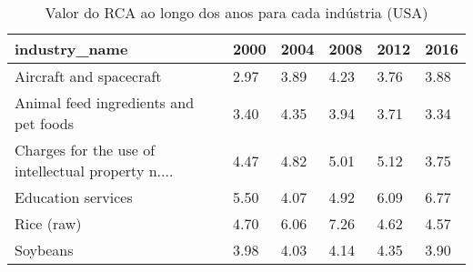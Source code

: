 \begin{table}
\centering
\caption{Valor do RCA ao longo dos anos para cada indústria (USA)}
\begin{tabular}{p{6cm}p{1.5cm}p{1.5cm}p{1.5cm}p{1.5cm}p{1.5cm}}
\toprule
                                     industry\_name & 2000 & 2004 & 2008 & 2012 & 2016 \\
\midrule
                           Aircraft and spacecraft & 2.97 & 3.89 & 4.23 & 3.76 & 3.88 \\
             Animal feed ingredients and pet foods & 3.40 & 4.35 & 3.94 & 3.71 & 3.34 \\
Charges for the use of intellectual property n.... & 4.47 & 4.82 & 5.01 & 5.12 & 3.75 \\
                                Education services & 5.50 & 4.07 & 4.92 & 6.09 & 6.77 \\
                                        Rice (raw) & 4.70 & 6.06 & 7.26 & 4.62 & 4.57 \\
                                          Soybeans & 3.98 & 4.03 & 4.14 & 4.35 & 3.90 \\
\bottomrule
\end{tabular}
\end{table}
